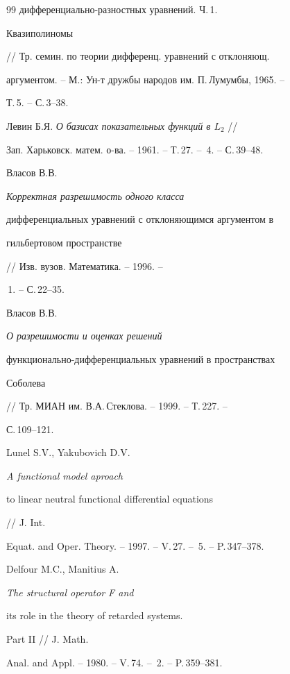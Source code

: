 \begin{thebibliography}{99}
{дифференциально-разностных уравнений.} Ч.\,1. {\it


Квазиполиномы}


// Тр. семин. по теории дифференц. уравнений с отклоняющ.


аргументом. -- М.: Ун-т дружбы народов им. П.\,Лумумбы, 1965. --


Т.\,5. -- С.\,3--38.







Левин Б.Я. {\it О базисах показательных функций в $L_2$} //


Зап. Харьковск. матем. о-ва. -- 1961. -- Т.\,27. -- \No\,4. -- С.\,39--48.





 Власов В.В. {\it Корректная разрешимость одного класса


дифференциальных уравнений с отклоняющимся аргументом в


гильбертовом пространстве} // Изв. вузов. Математика. -- 1996. --


\No\,1. -- С.\,22--35.







Власов В.В. {\it О разрешимости и оценках решений


функционально-дифференциальных уравнений в пространствах


Соболева} // Тр. МИАН им. В.А.\,Стеклова. -- 1999. -- Т.\,227. -- 


С.\,109--121.







Lunel S.V., Yakubovich D.V. {\it A functional model aproach


to linear neutral functional differential equations} // J. Int.


Equat. and Oper. Theory. -- 1997. -- V.\,27. -- \No\,5. -- P.\,347--378.







Delfour M.C., Manitius A. {\it The structural operator F and


its role in the theory of retarded systems.} Part II // J. Math.


Anal. and Appl. -- 1980. -- V.\,74. -- \No\,2. -- P.\,359--381.






\end{thebibliography}
